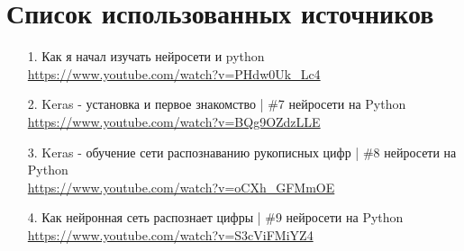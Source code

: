 \section*{Список использованных источников} %

\begin{enumerate}
    \item [1.] Как я начал изучать нейросети и python
        \\  \url{https://www.youtube.com/watch?v=PHdw0Uk_Lc4}
    \item [2.] Keras - установка и первое знакомство | \#7 нейросети на Python
        \\  \url{https://www.youtube.com/watch?v=BQg9OZdzLLE}
    \item [3.] Keras - обучение сети распознаванию рукописных цифр | \#8 нейросети на Python
        \\  \url{https://www.youtube.com/watch?v=oCXh_GFMmOE}
    \item [4.] Как нейронная сеть распознает цифры | \#9 нейросети на Python
        \\  \url{https://www.youtube.com/watch?v=S3cViFMiYZ4}
\end{enumerate}
